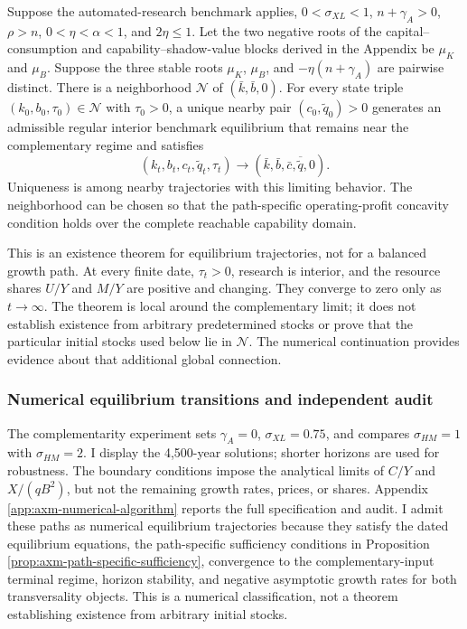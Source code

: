 \begin{proposition}
\label{prop:axm-complement-local-existence}
Suppose the automated-research benchmark applies,
\(0<\sigma_{XL}<1\), \(n+\gamma_A>0\), \(\rho>n\),
\(0<\eta<\alpha<1\), and \(2\eta\leq1\). Let the two negative roots of the
capital--consumption and capability--shadow-value blocks derived in the
Appendix be \(\mu_K\) and \(\mu_B\). Suppose the three stable roots
\(\mu_K\), \(\mu_B\), and \(-\eta(n+\gamma_A)\) are pairwise distinct.
There is a neighborhood \(\mathcal N\) of \((\bar k,\bar b,0)\). For every
state triple \((k_0,b_0,\tau_0)\in\mathcal N\) with \(\tau_0>0\), a unique nearby pair
\((c_0,\widetilde q_0)>0\) generates an admissible regular interior benchmark
equilibrium that remains near the complementary regime and satisfies
\begin{equation}
 (k_t,b_t,c_t,\widetilde q_t,\tau_t)\longrightarrow
 (\bar k,\bar b,\bar c,\overline{\widetilde q},0).
 \label{eq:axm-complement-local-convergence}
\end{equation}
Uniqueness is among nearby trajectories with this limiting behavior. The
neighborhood can be chosen so that the path-specific operating-profit
concavity condition holds over the complete reachable capability domain.
\end{proposition}

This is an existence theorem for equilibrium trajectories, not for a balanced
growth path. At every finite date, \(\tau_t>0\), research is interior, and the
resource shares \(U/Y\) and \(M/Y\) are positive and changing. They converge
to zero only as \(t\to\infty\). The theorem is local around the complementary
limit; it does not establish existence from arbitrary predetermined stocks or
prove that the particular initial stocks used below lie in \(\mathcal N\).
The numerical continuation provides evidence about that additional global
connection.

\subsubsection{Numerical equilibrium transitions and independent audit}

The complementarity experiment sets \(\gamma_A=0\),
\(\sigma_{XL}=0.75\), and compares
\(\sigma_{HM}=1\) with \(\sigma_{HM}=2\). I display the 4,500-year solutions;
shorter horizons are used for robustness. The boundary conditions impose the
analytical limits of \(C/Y\) and \(X/(qB^2)\), but not the remaining growth
rates, prices, or shares. Appendix \ref{app:axm-numerical-algorithm} reports the
full specification and audit. I admit these paths as numerical equilibrium
trajectories because they satisfy the dated equilibrium equations, the
path-specific sufficiency conditions in Proposition
\ref{prop:axm-path-specific-sufficiency},
convergence to the complementary-input terminal regime, horizon stability, and
negative asymptotic growth rates for both transversality objects. This is a
numerical classification, not a theorem establishing existence from arbitrary
initial stocks.


